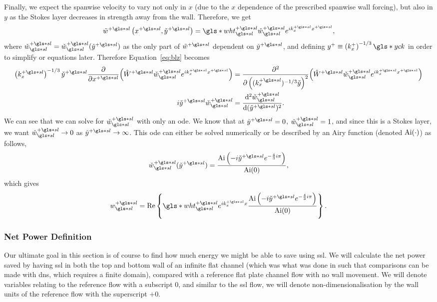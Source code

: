 Finally, we expect the spanwise velocity to vary not only in $x$ (due to the  $x$ dependence of the prescribed spanwise wall forcing), but also in  $y$ as the Stokes layer decreases in strength away from the wall. Therefore, we get
\begin{equation}
	\tilde{w}\ps\left(x\ps,\check{y}\ps\right)=\gls*{wht}\ps\ssl\check{w}\ssl\ps e^{ik\ps_x x\ps}\label{eq:wtlddef}
,\end{equation}
where $\check{w}\ssl \ps=\check{w}\ssl \ps(\check{y}\ps)$ as the only part of $\tilde{w}\ps$ dependent on $\check{y}\ps$, and defining $y^{+}\equiv\left(k^{+}_x\right)^{-1 /3}\gls*{yck}$ in order to simplify or equations later.
Therefore Equation~\eqref{eq:blz} becomes
\begin{align}
	\left( k_x\ps \right) ^{-1 /3} \check{y}\ps \pdv{x\ps}(\hat{W}\ps \check{w}\ps\ssl e^{ik_x\ps x\ps})&= \pdv[2]{\left( (k_x\ps)^{-1 /3}\check{y} \right) }(\hat{W}\ps \check{w}\ps\ssl e^{ik_x\ps x\ps})\nonumber\\
	i \check{y}\ps \check{w}\ps\ssl &= \dv[2]{\check{w}\ps\ssl}{(\check{y}\ps)} 
.\end{align}
We can see that we can solve for $\check{w}\ps\ssl$ with only an \gls*{ode}. We know that at $\check{y}\ps=0$, $\check{w}\ps\ssl=1$, and since this is a Stokes layer, we want $\check{w}\ps\ssl \to 0$ as $\check{y}\ps\to \infty$. This \gls*{ode} can either be solved numerically or be described by an Airy function (denoted $\operatorname{Ai} (\cdot)$) as follows,
 \begin{equation}
	 \check{w}\ps\ssl(\check{y}\ps)= \frac{\Ai\left(-i \check{y}\ps e ^{-\frac{4}{3}i\pi}\right)}{\Ai(0)}\label{eq:wchecksoln}
,\end{equation}
which gives
\begin{equation}
	w\ps\ssl = \Re \left\{ \gls*{wht}\ps\ssl e^{i k_{x}\ps x}\frac{\Ai\left(-i \check{y}\ps e ^{-\frac{4}{3}i\pi}\right)}{\Ai(0)}\right\}
.\end{equation}

\subsubsection{Net Power Definition}
Our ultimate goal in this section is of course to find how much energy we might be able to save using \gls*{ssl}. We will calculate the net power saved by having \gls*{ssl} in both the top and bottom wall of an infinite flat channel (which was what was done in \textcite{viotti2009} such that comparisons can be made with \gls*{dns}, which requires a finite domain), compared with a reference flat plate channel flow with no wall movement. We will denote variables relating to the reference flow with a subscript 0, and similar to the \gls*{ssl} flow, we will denote non-dimensionalisation by the wall units of the reference flow with the superscript $+0$.


